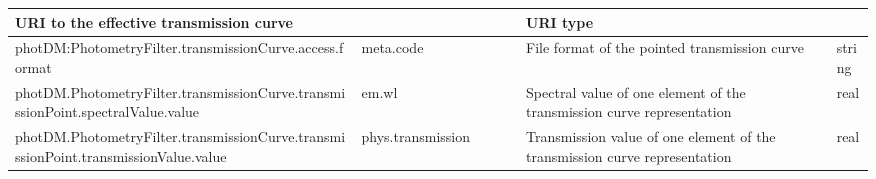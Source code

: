 \documentclass[11pt,a4paper]{ivoa}
\begin{document}
\begin{appendices}
\begin{table}[H]
\begin{adjustbox}{angle=90}
\begin{tabular}{p{7in}p{0.87in}p{0.91in}p{0.4in}p{0.25in}}
\multicolumn{1}{p{0.91in}}{{\fontsize{8pt}{8pt}\selectfont URI to the 
effective transmission curve}} &
\multicolumn{1}{p{0.74in}}{} &
\multicolumn{1}{p{0.35in}}{{\fontsize{8pt}{8pt}\selectfont URI type}} \\
\hline
\multicolumn{1}{p{5in}}{{\fontsize{8pt}{8pt}
\selectfont photDM:PhotometryFilter.transmissionCurve.access.format}} &
\multicolumn{1}{p{0.87in}}{{\fontsize{8pt}{8pt}\selectfont meta.code}} &
\multicolumn{1}{p{0.91in}}{{\fontsize{8pt}{8pt}\selectfont File format of the pointed transmission curve}} &
\multicolumn{1}{p{0.74in}}{} &
\multicolumn{1}{p{0.35in}}{{\fontsize{8pt}{8pt}\selectfont string}} \\
\hline
\multicolumn{1}{p{5in}}{{\fontsize{8pt}{8pt}
\selectfont photDM.PhotometryFilter.transmissionCurve.transmissionPoint.spectralValue.value}} &
\multicolumn{1}{p{0.87in}}{{\fontsize{8pt}{8pt}\selectfont em.wl}} &
\multicolumn{1}{p{0.91in}}{{\fontsize{8pt}{8pt}\selectfont Spectral value 
of one element of the transmission curve representation}} &
\multicolumn{1}{p{0.74in}}{} &
\multicolumn{1}{p{0.35in}}{{\fontsize{8pt}{8pt}\selectfont real}} \\
\hline
\multicolumn{1}{p{5in}}{{\fontsize{8pt}{8pt}
\selectfont photDM.PhotometryFilter.transmissionCurve.transmissionPoint.transmissionValue.value}} &
\multicolumn{1}{p{0.87in}}{{\fontsize{8pt}{8pt}
\selectfont phys.transmission\ \ \ \ \ \ \ \ \ \ \ \ \ \ \ \ \ \ \  }} &
\multicolumn{1}{p{0.91in}}{{\fontsize{8pt}{8pt}\selectfont Transmission value of 
one element of the transmission curve representation}} &
\multicolumn{1}{p{0.74in}}{} &
\multicolumn{1}{p{0.35in}}{{\fontsize{8pt}{8pt}\selectfont real}} \\
\hline

\end{tabular}
\end{adjustbox}
 \end{table}





\newpage




\end{appendices}
\end{document}
